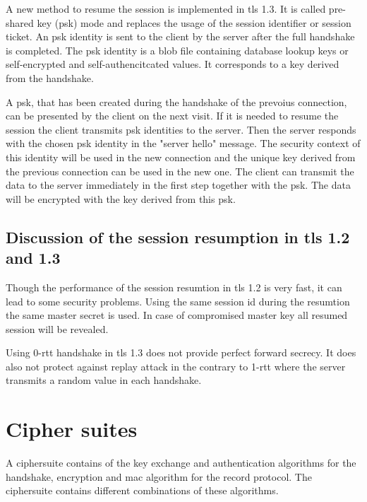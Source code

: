 A new method to resume the session is implemented in \gls{tls} 1.3. It is called pre-shared key (\gls{psk}) mode and replaces the usage of the session identifier or session ticket. An \gls{psk} identity is sent to the client by the server after the full handshake is completed. The \gls{psk} identity is a blob file containing database lookup keys or self-encrypted and self-authencitcated values. It corresponds to a key derived from the handshake.

A \gls{psk}, that has been created during the handshake of the prevoius connection, can be presented by the client on the next visit. If it is needed to resume the session the client transmits \gls{psk} identities to the server. Then the server responds with the chosen \gls{psk} identity in the "server hello" message. The security context of this identity will be used in the new connection and the unique key derived from the previous connection can be used in the new one. 
The client can transmit the data to the server immediately in the first step together with the \gls{psk}. The data will be encrypted with the key derived from this \gls{psk}.\cite{ldapwiki:resumption}

\subsection{Discussion of the session resumption in \gls{tls} 1.2 and 1.3}
\label{subsec:discussion_resumption}

Though the performance of the session resumtion in \gls{tls} 1.2 is very fast, it can lead to some security problems. Using the same session id during the resumtion the same master secret is used. In case of compromised master key all resumed session will be revealed.

Using 0-\gls{rtt} handshake in \gls{tls} 1.3 does not provide perfect forward secrecy. It does also not protect against replay attack in the contrary to 1-\gls{rtt} where the server transmits a random value in each handshake.


\section{Cipher suites}
\label{sec:comparison_ciphersuits}

A ciphersuite contains of the key exchange and authentication algorithms for the handshake, encryption and \gls{mac} algorithm for the record protocol. The ciphersuite contains different combinations of these algorithms.

